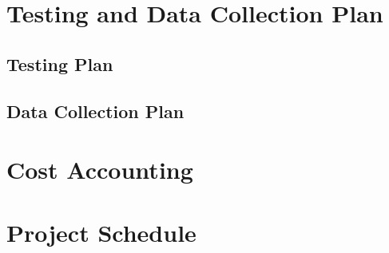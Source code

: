\documentclass[11pt]{report}
\begin{document}
\begin{spacing}{1.5}
\section*{Testing and Data Collection Plan} %

\subsection*{Testing Plan}

\subsection*{Data Collection Plan}

\section*{Cost Accounting} %

\section*{Project Schedule} %

{}




\end{spacing}
\end{document}

